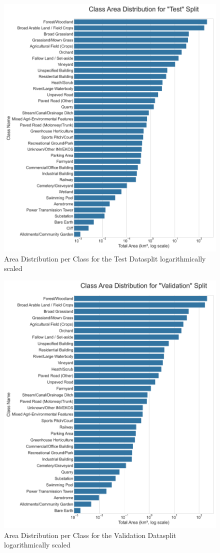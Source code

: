 \documentclass{report}
\begin{document}
\begin{figure}[H]
    \centering
    \includegraphics[width=0.65\linewidth]{own_images/area_distribution_test.png}
    \caption{Area Distribution per Class for the Test Datasplit logarithmically scaled}
    \label{fig:test_data_distribution_log}
\end{figure}

\begin{figure}[H]
    \centering
    \includegraphics[width=0.65\linewidth]{own_images/area_distribution_validation.png}
    \caption{Area Distribution per Class for the Validation Datasplit logarithmically scaled}
    \label{fig:val_data_distribution_log}
\end{figure}
\end{document}
